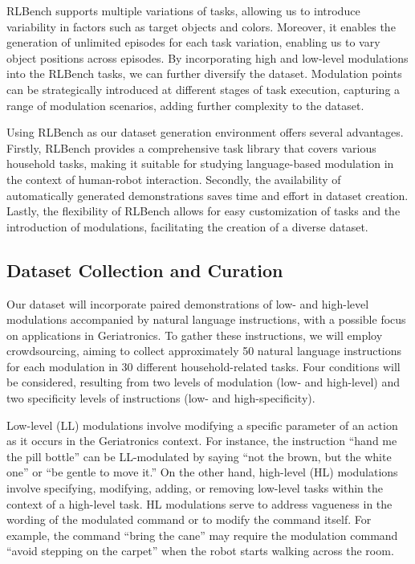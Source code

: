 \documentclass[journal]{IEEEtran}
\begin{document}
RLBench supports multiple variations of tasks, allowing us to 
introduce variability in factors such as target objects and 
colors. Moreover, it enables the generation of unlimited 
episodes for each task variation, enabling us to vary object 
positions across episodes. By incorporating high and low-level 
modulations into the RLBench tasks, we can further diversify 
the dataset. Modulation points can be strategically introduced 
at different stages of task execution, capturing a range 
of modulation scenarios, adding further complexity to the
dataset.

Using RLBench as our dataset generation environment offers 
several advantages. Firstly, RLBench provides a comprehensive 
task library that covers various household tasks, making it 
suitable for studying language-based modulation in the context 
of human-robot interaction. Secondly, the availability of 
automatically generated demonstrations saves time and effort 
in dataset creation. Lastly, the flexibility of RLBench allows 
for easy customization of tasks and the introduction of 
modulations, facilitating the creation of a diverse 
dataset.

\subsection{Dataset Collection and Curation}

Our dataset will incorporate paired demonstrations of low- 
and high-level modulations accompanied by natural language 
instructions, with a possible focus on applications in Geriatronics. 
To gather these instructions, we will employ crowdsourcing, aiming 
to collect approximately 50 natural language instructions for each 
modulation in 30 different household-related tasks. Four conditions
will be considered, resulting from two levels of modulation 
(low- and high-level) and two specificity levels of instructions
(low- and high-specificity).

Low-level (LL) modulations involve modifying a specific parameter 
of an action as it occurs in the Geriatronics context. For instance, 
the instruction ``hand me the pill bottle'' can be LL-modulated by 
saying ``not the brown, but the white one'' or ``be gentle to move it.''
On the other hand, high-level (HL) modulations involve specifying, 
modifying, adding, or removing low-level tasks within the context 
of a high-level task. HL modulations serve to address vagueness in 
the wording of the modulated command or to modify the command itself. 
For example, the command ``bring the cane'' may require the 
modulation command ``avoid stepping on the carpet'' when the robot 
starts walking across the room.
\end{document}
